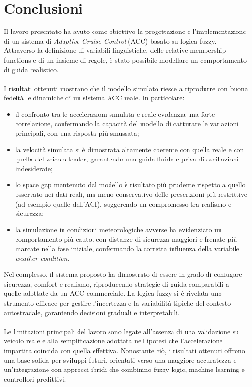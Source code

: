 \chapter{Conclusioni}
\label{cha:conclusioni}

\noindent Il lavoro presentato ha avuto come obiettivo la progettazione e l'implementazione 
di un sistema di \textit{Adaptive Cruise Control} (ACC) basato su logica fuzzy.  
Attraverso la definizione di variabili linguistiche, delle relative membership functions 
e di un insieme di regole, è stato possibile modellare un comportamento 
di guida realistico.
\\\\
\noindent I risultati ottenuti mostrano che il modello simulato riesce a riprodurre con buona 
fedeltà le dinamiche di un sistema ACC reale.  
In particolare:
\begin{itemize}
    \item il confronto tra le accelerazioni simulata e reale evidenzia una forte correlazione, 
    confermando la capacità del modello di catturare le variazioni principali, con una risposta più smussata;
    \item la velocità simulata si è dimostrata altamente coerente con quella reale e con quella del veicolo leader, 
    garantendo una guida fluida e priva di oscillazioni indesiderate;
    \item lo space gap mantenuto dal modello è risultato più prudente rispetto a quello osservato nei dati reali, 
    ma meno conservativo delle prescrizioni più restrittive (ad esempio quelle dell'ACI), 
    suggerendo un compromesso tra realismo e sicurezza;
    \item la simulazione in condizioni meteorologiche avverse ha evidenziato un comportamento più cauto, 
    con distanze di sicurezza maggiori e frenate più marcate nella fase iniziale, confermando 
    la corretta influenza della variabile \textit{weather condition}.
\end{itemize}

\noindent Nel complesso, il sistema proposto ha dimostrato di essere in grado di coniugare sicurezza, comfort e realismo, 
riproducendo strategie di guida comparabili a quelle adottate da un ACC commerciale.  
La logica fuzzy si è rivelata uno strumento efficace per gestire l'incertezza e la variabilità tipiche del contesto autostradale, 
garantendo decisioni graduali e interpretabili.
\\\\
\noindent Le limitazioni principali del lavoro sono legate all'assenza di una validazione su veicolo reale 
e alla semplificazione adottata nell'ipotesi che l'accelerazione impartita coincida con quella effettiva.  
Nonostante ciò, i risultati ottenuti offrono una base solida per sviluppi futuri, 
orientati verso una maggiore accuratezza e un'integrazione con approcci ibridi che combinino fuzzy logic, 
machine learning e controllori predittivi.

